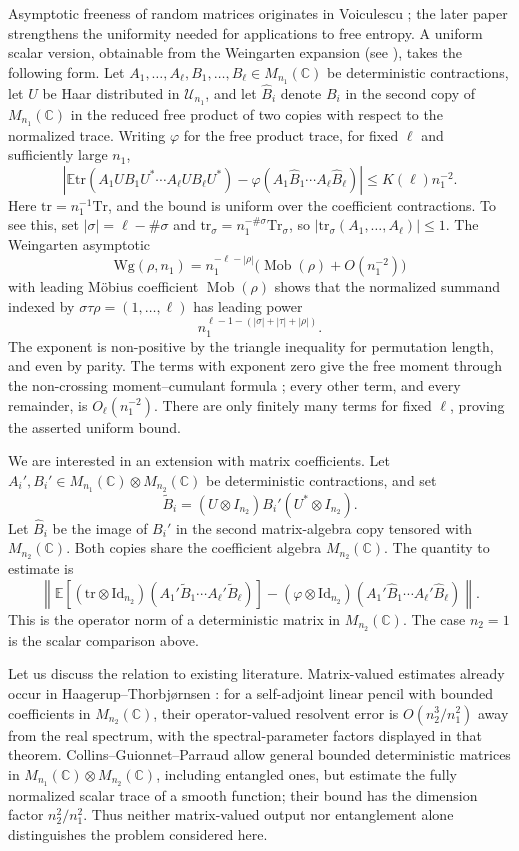\documentclass[12pt]{article}
\numberwithin{equation}{section}
\theoremstyle{plain}
\def\bE{\mathbb E}
\def\bC{\mathbb C}
\def\id{\mathrm {Id}}
\def\Tr{\mathrm {Tr}}
\def\tr{\mathrm {tr}}
\def\Wg{\mathrm {Wg}}
\begin{document}
Asymptotic freeness of random matrices originates in Voiculescu \cite{Voiculescu1991}; the later paper \cite{Voi1998IMRN} strengthens the uniformity needed for applications to free entropy.
A uniform scalar version, obtainable from the Weingarten expansion (see \cite[Corollaries~2.4 and~2.7]{CollinsSnady2006}), takes the following form. Let $A_1,\ldots,A_\ell,B_1,\ldots,B_\ell\in M_{n_1}(\bC)$ be deterministic contractions, let $U$ be Haar distributed in $\mathcal U_{n_1}$, and let $\widehat B_i$ denote $B_i$ in the second copy of $M_{n_1}(\bC)$ in the reduced free product of two copies with respect to the normalized trace. Writing $\varphi$ for the free product trace, for fixed $\ell$ and sufficiently large $n_1$,
\[
\left|\bE\tr(A_1UB_1U^*\cdots A_\ell UB_\ell U^*)
-\varphi(A_1\widehat B_1\cdots A_\ell\widehat B_\ell)\right|
\le K(\ell)n_1^{-2}.
\]
Here $\tr=n_1^{-1}\Tr$, and the bound is uniform over the coefficient contractions. To see this, set $|\sigma|=\ell-\#\sigma$ and $\tr_\sigma=n_1^{-\#\sigma}\Tr_\sigma$, so $|\tr_\sigma(A_1,\ldots,A_\ell)|\le1$. The Weingarten asymptotic
\[
\Wg(\rho,n_1)=n_1^{-\ell-|\rho|}\bigl(\operatorname{Mob}(\rho)+O(n_1^{-2})\bigr)
\]
with leading M\"obius coefficient $\operatorname{Mob}(\rho)$ shows that the normalized summand indexed by $\sigma\tau\rho=(1,\ldots,\ell)$ has leading power
\[
n_1^{\ell-1-(|\sigma|+|\tau|+|\rho|)}.
\]
The exponent is non-positive by the triangle inequality for permutation length, and even by parity. The terms with exponent zero give the free moment through the non-crossing moment--cumulant formula \cite[Chapter~14]{NicaSpeicher2006}; every other term, and every remainder, is $O_\ell(n_1^{-2})$. There are only finitely many terms for fixed $\ell$, proving the asserted uniform bound.

We are interested in an extension with matrix coefficients. Let $A_i',B_i'\in M_{n_1}(\bC)\otimes M_{n_2}(\bC)$ be deterministic contractions, and set
\[
\widetilde B_i=(U\otimes I_{n_2})B_i'(U^*\otimes I_{n_2}).
\]
Let $\widehat B_i$ be the image of $B_i'$ in the second matrix-algebra copy tensored with $M_{n_2}(\bC)$. Both copies share the coefficient algebra $M_{n_2}(\bC)$. The quantity to estimate is
\[
\left\|\bE[(\tr\otimes\id_{n_2})(A_1'\widetilde B_1\cdots A_\ell'\widetilde B_\ell)]
-(\varphi\otimes\id_{n_2})(A_1'\widehat B_1\cdots A_\ell'\widehat B_\ell)\right\|.
\]
This is the operator norm of a deterministic matrix in $M_{n_2}(\bC)$. The case $n_2=1$ is the scalar comparison above.

Let us discuss the relation to existing literature.
Matrix-valued estimates already occur in Haagerup--Thorbj\o rnsen \cite[Theorem~5.7]{HaagerupThorbjornsen2005}: for a self-adjoint linear pencil with bounded coefficients in $M_{n_2}(\bC)$, their operator-valued resolvent error is $O(n_2^3/n_1^2)$ away from the real spectrum, with the spectral-parameter factors displayed in that theorem. Collins--Guionnet--Parraud \cite[Theorem~1.1]{MR4445344} allow general bounded deterministic matrices in $M_{n_1}(\bC)\otimes M_{n_2}(\bC)$, including entangled ones, but estimate the fully normalized scalar trace of a smooth function; their bound has the dimension factor $n_2^2/n_1^2$. Thus neither matrix-valued output nor entanglement alone distinguishes the problem considered here.
\end{document}
